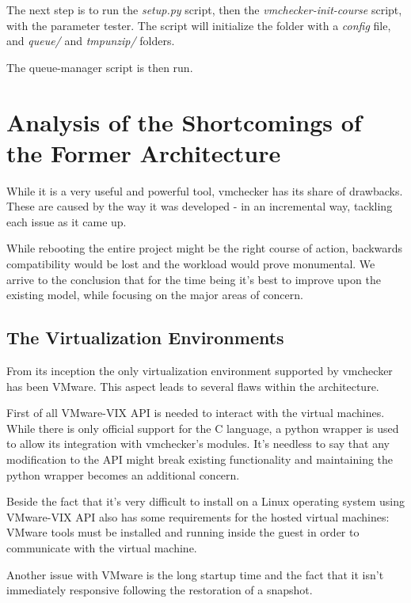 The next step is to run the \textit{setup.py} script, then the \textit{vmchecker-init-course} script,
with the parameter tester. The script will initialize the folder with a {\it config} file,
and \textit{queue/} and \textit{tmpunzip/} folders.

The queue-manager script is then run. 

\section{Analysis of the Shortcomings of the Former Architecture}
\label{sec:vmc-analysis}

While it is a very useful and powerful tool, vmchecker has its share of drawbacks.
These are caused by the way it was developed - in an incremental way, tackling 
each issue as it came up. 

While rebooting the entire project might be the right course of action, 
backwards compatibility would be lost and the workload would 
prove monumental. We arrive to the conclusion that for the time being it's best
to improve upon the existing model, while focusing on the major areas of concern.

\subsection{The Virtualization Environments}
\label{sub-sec:vmc-analysis-env}

From its inception the only virtualization environment supported by vmchecker 
has been VMware. This aspect leads to several flaws within the architecture.

First of all VMware-VIX API is needed to interact with the virtual machines. 
While there is only official support for the C language, a python wrapper is
used to allow its integration with vmchecker's modules. It's needless to say
that any modification to the API might break existing functionality and 
maintaining the python wrapper becomes an additional concern.

Beside the fact that it's very difficult to install on a Linux operating system
using VMware-VIX API also has some requirements for the hosted virtual machines:
VMware tools must be installed and running inside the guest in order to communicate
with the virtual machine.

Another issue with VMware is the long startup time and the fact that it isn't 
immediately responsive following the restoration of a snapshot.

